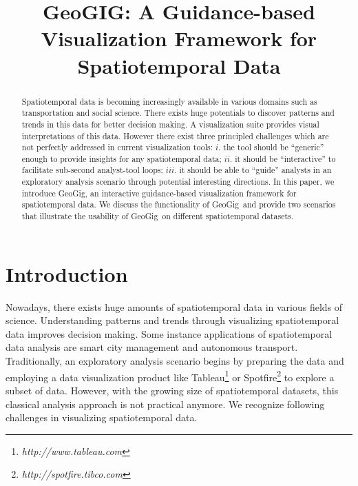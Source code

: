 \documentclass[conference]{IEEEtran}
\newcommand{\sys}{{\sc GeoGig}}
\begin{document}
\title{GeoGIG: A Guidance-based Visualization Framework for Spatiotemporal Data}


\author{
\and
{}
}

\maketitle


\begin{abstract}
Spatiotemporal data is becoming increasingly available in various domains such as transportation and social science. There exists huge potentials to discover patterns and trends in this data for better decision making. A visualization suite provides visual interpretations of this data. However there exist three principled challenges which are not perfectly addressed in current visualization tools: $i.$  the tool should be ``generic'' enough to provide insights for any spatiotemporal data; $ii.$ it should be ``interactive'' to facilitate sub-second analyst-tool loops; $iii.$ it should be able to ``guide'' analysts in an exploratory analysis scenario through potential interesting directions. In this paper, we introduce \sys, an interactive guidance-based visualization framework for spatiotemporal data. We discuss the functionality of \sys\ and provide two scenarios that illustrate the usability of \sys\ on different spatiotemporal datasets.
\end{abstract}

\IEEEpeerreviewmaketitle

\vspace{-5pt}
\section{Introduction} 
Nowadays, there exists huge amounts of spatiotemporal data in various fields of science. Understanding patterns and trends through visualizing spatiotemporal data improves decision making. Some instance applications of spatiotemporal data analysis are smart city management and autonomous transport. Traditionally, an exploratory analysis scenario begins by preparing the data and employing a data visualization product like Tableau\footnote{\it http://www.tableau.com} or Spotfire\footnote{\it http://spotfire.tibco.com} to explore a subset of data. However, with the growing size of spatiotemporal datasets, this classical analysis approach is not practical anymore. We recognize following challenges in visualizing spatiotemporal data.
\end{document}
